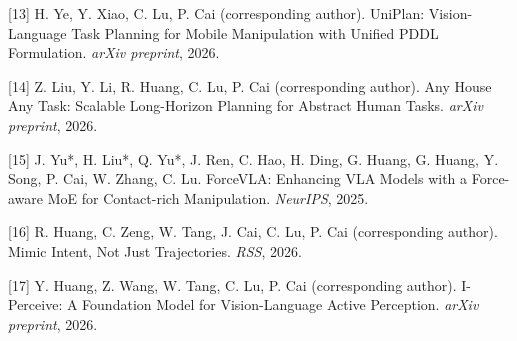 \documentclass{article}
\begin{document}
[13] H. Ye, Y. Xiao, C. Lu, P. Cai (corresponding author). UniPlan: Vision-Language Task Planning for Mobile Manipulation with Unified PDDL Formulation. \textit{arXiv preprint}, 2026.

[14] Z. Liu, Y. Li, R. Huang, C. Lu, P. Cai (corresponding author). Any House Any Task: Scalable Long-Horizon Planning for Abstract Human Tasks. \textit{arXiv preprint}, 2026.

[15] J. Yu*, H. Liu*, Q. Yu*, J. Ren, C. Hao, H. Ding, G. Huang, G. Huang, Y. Song, P. Cai, W. Zhang, C. Lu. ForceVLA: Enhancing VLA Models with a Force-aware MoE for Contact-rich Manipulation. \textit{NeurIPS}, 2025.

[16] R. Huang, C. Zeng, W. Tang, J. Cai, C. Lu, P. Cai (corresponding author). Mimic Intent, Not Just Trajectories. \textit{RSS}, 2026.

[17] Y. Huang, Z. Wang, W. Tang, C. Lu, P. Cai (corresponding author). I-Perceive: A Foundation Model for Vision-Language Active Perception. \textit{arXiv preprint}, 2026.
\end{document}
